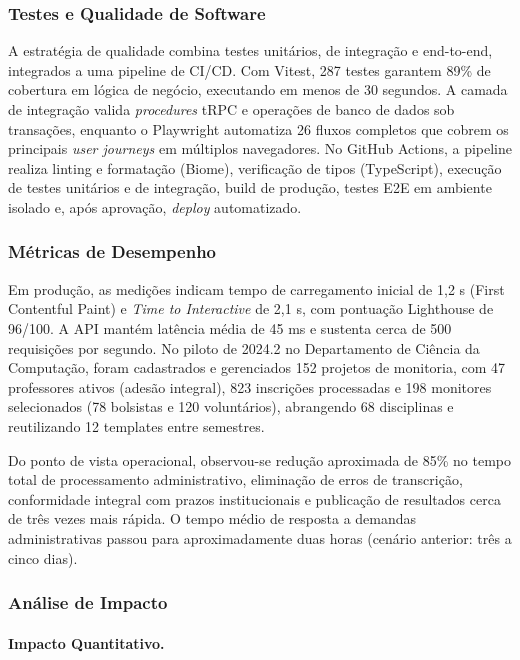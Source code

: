 \documentclass[portuguese]{sbc2025}%
\begin{document}
\subsubsection{Testes e Qualidade de Software}

A estratégia de qualidade combina testes unitários, de integração e end-to-end, integrados a uma pipeline de CI/CD. Com Vitest, 287 testes garantem 89\% de cobertura em lógica de negócio, executando em menos de 30 segundos. A camada de integração valida \textit{procedures} tRPC e operações de banco de dados sob transações, enquanto o Playwright automatiza 26 fluxos completos que cobrem os principais \textit{user journeys} em múltiplos navegadores. No GitHub Actions, a pipeline realiza linting e formatação (Biome), verificação de tipos (TypeScript), execução de testes unitários e de integração, build de produção, testes E2E em ambiente isolado e, após aprovação, \textit{deploy} automatizado.

\subsubsection{Métricas de Desempenho}

Em produção, as medições indicam tempo de carregamento inicial de 1,2 s (First Contentful Paint) e \textit{Time to Interactive} de 2,1 s, com pontuação Lighthouse de 96/100. A API mantém latência média de 45 ms e sustenta cerca de 500 requisições por segundo. No piloto de 2024.2 no Departamento de Ciência da Computação, foram cadastrados e gerenciados 152 projetos de monitoria, com 47 professores ativos (adesão integral), 823 inscrições processadas e 198 monitores selecionados (78 bolsistas e 120 voluntários), abrangendo 68 disciplinas e reutilizando 12 templates entre semestres.

Do ponto de vista operacional, observou-se redução aproximada de 85\% no tempo total de processamento administrativo, eliminação de erros de transcrição, conformidade integral com prazos institucionais e publicação de resultados cerca de três vezes mais rápida. O tempo médio de resposta a demandas administrativas passou para aproximadamente duas horas (cenário anterior: três a cinco dias).

\subsubsection{Análise de Impacto}

\paragraph{Impacto Quantitativo.}
\end{document}
